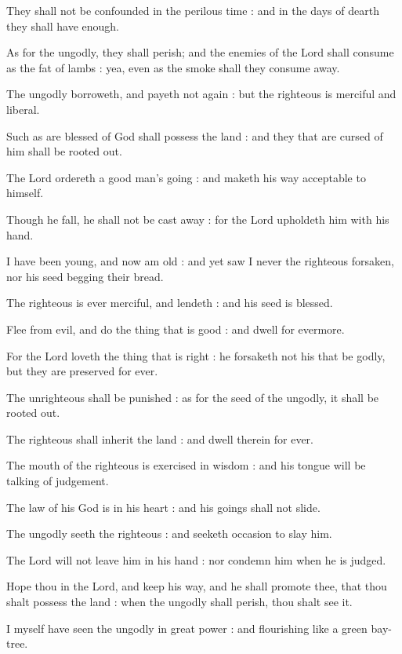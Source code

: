 They shall not be confounded in the perilous time : and in the days of dearth they shall have enough.\par
{}As for the ungodly, they shall perish; and the enemies of the Lord shall consume as the fat of lambs : yea, even as the smoke shall they consume away.\par
{}The ungodly borroweth, and payeth not again : but the righteous is merciful and liberal.\par
{}Such as are blessed of God shall possess the land : and they that are cursed of him shall be rooted out.\par
{}The Lord ordereth a good man's going : and maketh his way acceptable to himself.\par
{}Though he fall, he shall not be cast away : for the Lord upholdeth him with his hand.\par
{}I have been young, and now am old : and yet saw I never the righteous forsaken, nor his seed begging their bread.\par
{}The righteous is ever merciful, and lendeth : and his seed is blessed.\par
{}Flee from evil, and do the thing that is good : and dwell for evermore.\par
{}For the Lord loveth the thing that is right : he forsaketh not his that be godly, but they are preserved for ever.\par
{}The unrighteous shall be punished : as for the seed of the ungodly, it shall be rooted out.\par
{}The righteous shall inherit the land : and dwell therein for ever.\par
{}The mouth of the righteous is exercised in wisdom : and his tongue will be talking of judgement.\par
{}The law of his God is in his heart : and his goings shall not slide.\par
{}The ungodly seeth the righteous : and seeketh occasion to slay him.\par
{}The Lord will not leave him in his hand : nor condemn him when he is judged.\par
{}Hope thou in the Lord, and keep his way, and he shall promote thee, that thou shalt possess the land : when the ungodly shall perish, thou shalt see it.\par
{}I myself have seen the ungodly in great power : and flourishing like a green bay-tree.\par
